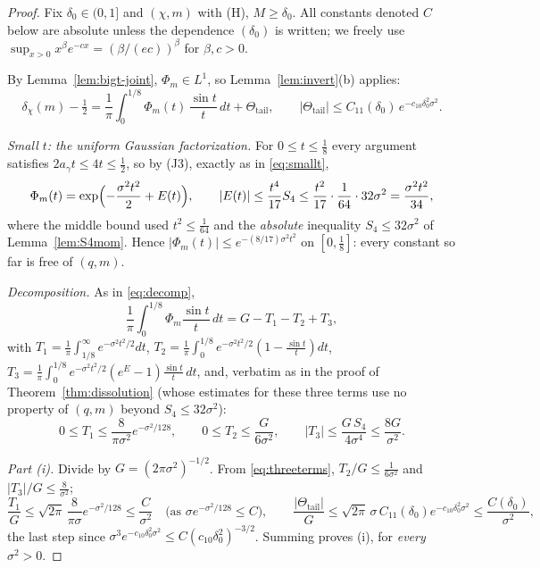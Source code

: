 \documentclass[11pt]{article}
\begin{document}
\begin{proof}
Fix $\delta_0\in(0,1]$ and $(\chi,m)$ with (H), $M\ge\delta_0$. All
constants denoted $C$ below are absolute unless the dependence
$(\delta_0)$ is written; we freely use
$\sup_{x>0}x^{\beta}e^{-cx}=(\beta/(ec))^{\beta}$ for $\beta,c>0$.

By Lemma~\ref{lem:bigt-joint}, $\Phi_m\in L^1$, so
Lemma~\ref{lem:invert}(b) applies:
\begin{equation}\label{eq:GPq}
\delta_\chi(m)-\tfrac12
=\frac1\pi\int_0^{1/8}\Phi_m(t)\,\frac{\sin t}t\,dt
+\Theta_{\mathrm{tail}},
\qquad
|\Theta_{\mathrm{tail}}|\le
C_{11}(\delta_0)\,e^{-c_{10}\delta_0^2\sigma^2}.
\end{equation}

\emph{Small $t$: the uniform Gaussian factorization.} For
$0\le t\le\tfrac18$ every argument satisfies $2a_\gamma t\le4t\le
\tfrac12$, so by (J3), exactly as in \eqref{eq:smallt},
\[
\Phi_m(t)=\exp\Bigl(-\frac{\sigma^2t^2}2+E(t)\Bigr),
\qquad
|E(t)|\le\frac{t^4}{17}S_4
\le\frac{t^2}{17}\cdot\frac{1}{64}\cdot32\sigma^2
=\frac{\sigma^2t^2}{34},
\]
where the middle bound used $t^2\le\tfrac1{64}$ and the
\emph{absolute} inequality $S_4\le32\sigma^2$ of
Lemma~\ref{lem:S4mom}. Hence
$|\Phi_m(t)|\le e^{-(8/17)\sigma^2t^2}$ on $[0,\tfrac18]$: every
constant so far is free of $(q,m)$.

\emph{Decomposition.} As in \eqref{eq:decomp},
\[
\frac1\pi\int_0^{1/8}\Phi_m\frac{\sin t}t\,dt=G-T_1-T_2+T_3,
\]
with $T_1=\frac1\pi\int_{1/8}^\infty e^{-\sigma^2t^2/2}dt$,
$T_2=\frac1\pi\int_0^{1/8}e^{-\sigma^2t^2/2}(1-\tfrac{\sin t}t)dt$,
$T_3=\frac1\pi\int_0^{1/8}e^{-\sigma^2t^2/2}(e^{E}-1)\tfrac{\sin t}t\,dt$,
and, verbatim as in the proof of Theorem~\ref{thm:dissolution} (whose
estimates for these three terms use no property of $(q,m)$ beyond
$S_4\le32\sigma^2$):
\begin{equation}\label{eq:threeterms}
0\le T_1\le\frac{8}{\pi\sigma^2}e^{-\sigma^2/128},
\qquad
0\le T_2\le\frac{G}{6\sigma^2},
\qquad
|T_3|\le\frac{G\,S_4}{4\sigma^4}\le\frac{8G}{\sigma^2}.
\end{equation}

\emph{Part (i).} Divide by $G=(2\pi\sigma^2)^{-1/2}$. From
\eqref{eq:threeterms},
$T_2/G\le\tfrac1{6\sigma^2}$ and $|T_3|/G\le\tfrac8{\sigma^2}$;
\[
\frac{T_1}{G}\le\sqrt{2\pi}\,\frac{8}{\pi\sigma}e^{-\sigma^2/128}
\le\frac{C}{\sigma^{2}}
\quad\text{(as }\sigma e^{-\sigma^2/128}\le C\text{)},
\qquad
\frac{|\Theta_{\mathrm{tail}}|}{G}
\le\sqrt{2\pi}\,\sigma\,C_{11}(\delta_0)e^{-c_{10}\delta_0^2\sigma^2}
\le\frac{C(\delta_0)}{\sigma^{2}},
\]
the last step since
$\sigma^{3}e^{-c_{10}\delta_0^2\sigma^2}\le C(c_{10}\delta_0^2)^{-3/2}$.
Summing proves (i), for \emph{every} $\sigma^2>0$.


\end{proof}
\end{document}
